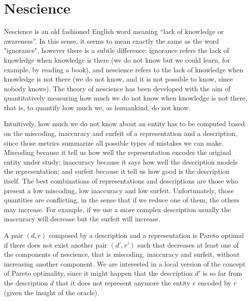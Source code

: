 %
%

\section{Nescience}
\label{sec:ch1_nescience}

Nescience is an old fashioned English word meaning “lack of knowledge or awareness”. In this sense, it seems to mean exactly the same as the word "ignorance", however there is a subtle difference: ignorance refers the lack of knowledge when knowledge is there (we do not know but we could learn, for example, by reading a book), and nescience refers to the lack of knowledge when knowledge is not there (we do not know, and it is not possible to know, since nobody knows). The theory of nescience has been developed with the aim of quantitatively measuring how much we do not know when knowledge is not there, that is, to quantify how much we, as humankind, do not know.

Intuitively, how much we do not know about an entity has to be computed based on the miscoding, inaccuracy and surfeit of a representation and a description, since those metrics summarize all possible types of mistakes we can make. Miscoding because it tell us how well the representation encodes the original entity under study; inaccuracy because it says how well the description models the representation; and surfeit because it tell us how good is the description itself. The best combinations of representations and descriptions are those who present a low miscoding, low inaccuracy and low surfeit. Unfortunately, those quantities are conflicting, in the sense that if we reduce one of them, the others may increase. For example, if we use a more complex description usually the inaccuracy will decrease but the surfeit will increase.

A pair $(d, r)$ composed by a description and a representation is Pareto optimal if there does not exist another pair $(d', r')$ such that decreases at least one of the components of nescience, that is miscoding, inaccuracy and surfeit, without increasing another component. We are interested in a local version of the concept of Pareto optimality, since it might happen that the description $d'$ is so far from the description $d$ that it does not represent anymore the entity $e$ encoded by $r$ (given the insight of the oracle).

